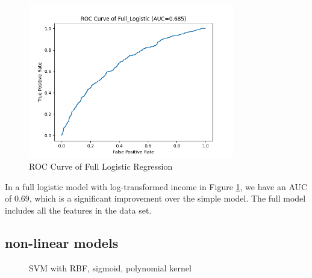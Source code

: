 \documentclass[10pt]{article} %
\begin{document}
    \begin{figure}
        \centering
        \includegraphics[width=0.8\textwidth]{"../fig/roc_curve_Full_Logistic.png"}
        \caption{ROC Curve of Full Logistic Regression}
        \label{fig:roc_fulllogistic}
    \end{figure}
    In a full logistic model with log-transformed income in Figure \ref{fig:roc_fulllogistic}, we have an AUC of 0.69, which is a significant improvement over the simple model. The full model includes all the features in the data set. 
    
    \subsection{non-linear models}
    \begin{figure}
        \centering
        \hfill
        \hfill
        \caption{SVM with RBF, sigmoid, polynomial kernel}
        \label{fig:three_svm}
    \end{figure}
\end{document}
